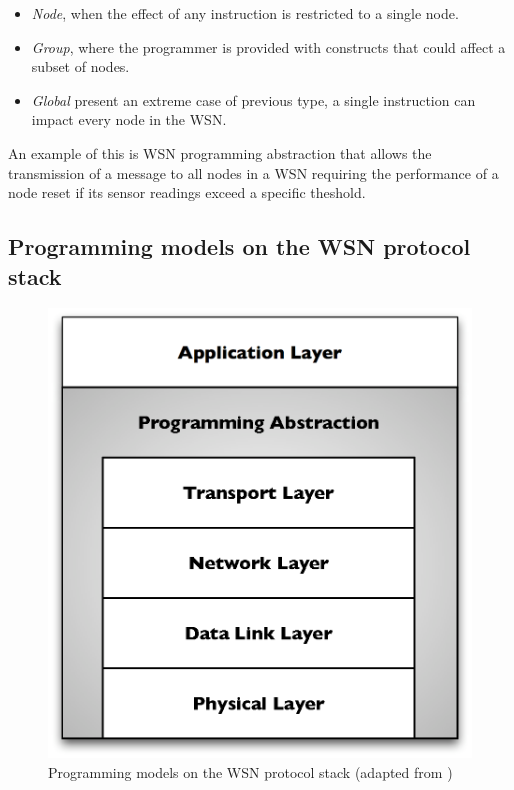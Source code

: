 \begin{itemize}
  \item \emph{Node}, when the effect of any instruction is restricted to a
  single node.
  \item \emph{Group}, where the programmer is provided with constructs that
  could affect a subset of nodes. 
  \item \emph{Global} present an extreme case of previous type, a single
  instruction can impact every node in the WSN.
\end{itemize}

 An example of this is WSN programming abstraction
 that allows the transmission of a message to all nodes in a WSN requiring the performance of a node reset if
 its sensor readings exceed a specific theshold.

\subsection{Programming models on the WSN protocol stack}

\begin{figure}
\centering
\includegraphics[scale=0.61]{img/ProtStack_ProgAbstr.eps}
\caption[Programming models on the WSN protocol stack]{Programming models on the WSN protocol
stack (adapted from \cite{mottola_middleware:2008})}
\label{Fig:ProtStack_ProgAbstr}
\end{figure}

